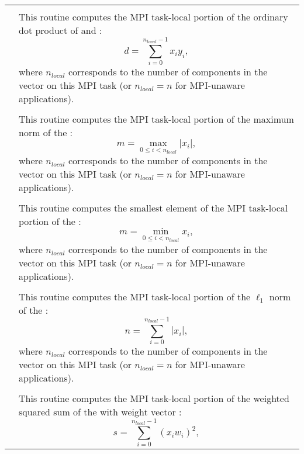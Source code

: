 \begin{xtabular}{|p{\coloned}|p{\coltwod}|}
 &  \\
& This routine computes the MPI task-local portion of the ordinary dot product of  and :
\begin{equation*}
d=\sum_{i=0}^{n_{local}-1} x_i y_i,
\end{equation*}
where $n_{local}$ corresponds
to the number of components in the vector on this MPI task (or
$n_{local}=n$ for MPI-unaware applications).
\\[2mm]
 &  \\
& This routine computes the MPI task-local portion of the maximum norm of the  :
\begin{equation*}
m = \max_{0\le i< n_{local}} | x_i |,
\end{equation*}
where $n_{local}$ corresponds
to the number of components in the vector on this MPI task (or
$n_{local}=n$ for MPI-unaware applications).
\\[2mm]
 &  \\
& This routine computes the smallest element of the MPI task-local portion of
the  :
\begin{equation*}
m = \min_{0\le i< n_{local}} x_i,
\end{equation*}
where $n_{local}$ corresponds
to the number of components in the vector on this MPI task (or
$n_{local}=n$ for MPI-unaware applications).
\\[2mm]
 &  \\
& This routine computes the MPI task-local portion of the $\ell_1$ norm of the  :
\begin{equation*}
n = \sum_{i=0}^{n_{local}-1} | x_i |,
\end{equation*}
where $n_{local}$ corresponds
to the number of components in the vector on this MPI task (or
$n_{local}=n$ for MPI-unaware applications).
\\[2mm]
 &  \\
& This routine computes the MPI task-local portion of the weighted
squared sum of the   with weight vector :
\begin{equation*}
s = \sum_{i=0}^{n_{local}-1} (x_i w_i)^2,
\end{equation*}

\end{xtabular}
